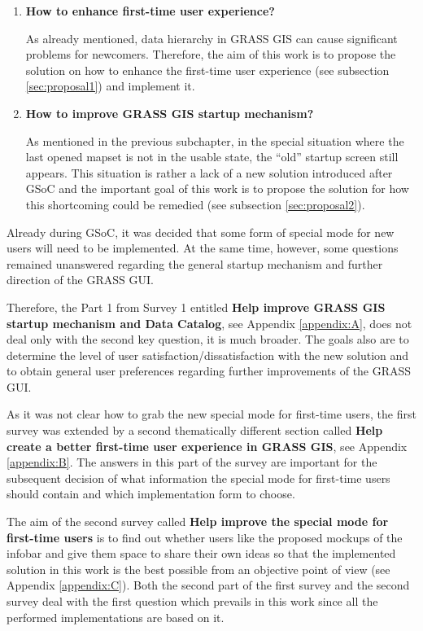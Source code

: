\documentclass[a4paper,10pt,twoside]{article}
\begin{document}
\begin{enumerate}

\item  \noindent \textbf{How to enhance first-time user experience?}

  \noindent As already mentioned, data hierarchy in GRASS GIS can
  cause significant problems for newcomers. Therefore, the aim of this
  work is to propose the solution on how to enhance the first-time
  user experience (see subsection \ref{sec:proposal1}) and implement
  it.


\item \noindent \textbf{How to improve GRASS GIS startup mechanism?}

  As mentioned in the previous subchapter, in the special situation
  where the last opened mapset is not in the usable state, the ``old''
  startup screen still appears. This situation is rather a lack of a
  new solution introduced after GSoC and the important goal of this
  work is to propose the solution for how this shortcoming could be
  remedied (see subsection \ref{sec:proposal2}).

\end{enumerate}

\noindent Already during GSoC, it was decided that some form of
special mode for new users will need to be implemented. At the same
time, however, some questions remained unanswered regarding the
general startup mechanism and further direction of the GRASS GUI.

Therefore, the Part 1 from Survey 1 entitled \textbf {Help
  improve GRASS GIS startup mechanism and Data Catalog}, see Appendix
\ref{appendix:A}, does not deal only with the second key question,
it is much broader. The goals also are to determine the level of user
satisfaction/dissatisfaction with the new solution and to obtain
general user preferences regarding further improvements of the GRASS
GUI.

As it was not clear how to grab the new special mode for first-time
users, the first survey was extended by a second thematically
different section called \textbf{Help create a better first-time user
  experience in GRASS GIS}, see Appendix \ref{appendix:B}. The answers
in this part of the survey are important for the subsequent decision
of what information the special mode for first-time users should
contain and which implementation form to choose.

The aim of the second survey called \textbf{Help improve the special
  mode for first-time users} is to find out whether users like the
proposed mockups of the infobar and give them space to share their
own ideas so that the implemented solution in this work is the best
possible from an objective point of view (see Appendix
\ref{appendix:C}). Both the second part of the first survey and the
second survey deal with the first question which prevails in this work
since all the performed implementations are based on it.
\end{document}
